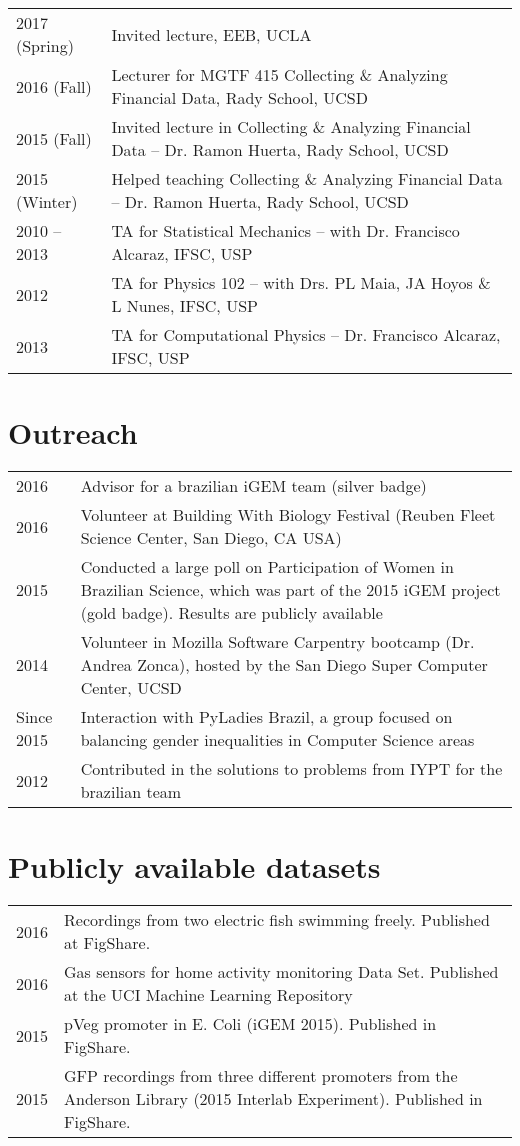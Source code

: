 \documentclass[letter,10pt]{article} %
\begin{document}
\begin{longtable}{p{2.5cm}p{15cm}}
  2017 (Spring) & Invited lecture, EEB, UCLA \\
  2016 (Fall) & Lecturer for MGTF 415 Collecting \& Analyzing Financial Data, Rady School, UCSD \\
  2015 (Fall) & Invited lecture in Collecting \& Analyzing Financial Data -- Dr. Ramon Huerta, Rady School, UCSD \\
  2015 (Winter) & Helped teaching Collecting \& Analyzing Financial Data -- Dr. Ramon Huerta, Rady School, UCSD \\
  2010 -- 2013  & TA for Statistical Mechanics -- with Dr. Francisco Alcaraz, IFSC, USP \\
  2012  & TA for Physics 102 -- with Drs. PL Maia, JA Hoyos \& L Nunes, IFSC, USP \\
  2013  & TA for Computational Physics -- Dr. Francisco Alcaraz, IFSC, USP
\end{longtable}


\section{Outreach}

\begin{longtable}{p{1.8cm}p{15cm}}
  2016 & Advisor for a brazilian iGEM team (silver badge) \\
  2016 & Volunteer at Building With Biology Festival (Reuben Fleet Science Center, San Diego, CA USA) \\
  2015 & Conducted a large poll on Participation of Women in Brazilian Science, which was part of the 2015 iGEM project (gold badge). Results are publicly available \\
  2014 & Volunteer in Mozilla Software Carpentry bootcamp  (Dr. Andrea Zonca), hosted by the San Diego Super Computer Center, UCSD \\
  Since 2015 & Interaction with PyLadies Brazil, a group focused on balancing gender inequalities in Computer Science areas \\
  2012 & Contributed in the solutions to problems from IYPT for the brazilian team
\end{longtable}


\section{Publicly available datasets }

\begin{longtable}{p{1.0cm}p{15.5cm}}
  2016 & Recordings from two electric fish swimming freely. Published at FigShare. \\
  2016 & Gas sensors for home activity monitoring Data Set. Published at the UCI Machine Learning Repository \\
  2015 & pVeg promoter in E. Coli (iGEM 2015). Published in FigShare. \\
  2015 & GFP recordings from three different promoters from the Anderson Library (2015 Interlab Experiment). Published in FigShare.
\end{longtable}
\end{document}
